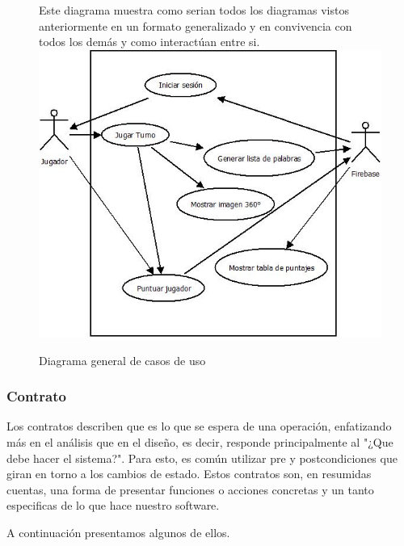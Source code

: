 \begin{figure}[H]
\centering
	Este diagrama muestra como serian todos los diagramas vistos anteriormente en un formato generalizado y en convivencia con todos los demás y como interactúan entre si.\\
	\bigskip\bigskip
   \includegraphics[scale=0.7]{imgs/DCUs.jpeg}
   \begin{center}
   \caption{Diagrama general de casos de uso}
   \end{center}
\end{figure}

\subsubsection{Contrato}
Los contratos describen que es lo que se espera de una operación, enfatizando más en el análisis que en el diseño, es decir, responde principalmente al "¿Que debe hacer el sistema?". Para esto, es común utilizar pre y postcondiciones que giran en torno a los cambios de estado.
Estos contratos son, en resumidas cuentas, una forma de presentar funciones o acciones concretas y un tanto especificas de lo que hace nuestro software.

A continuación presentamos algunos de ellos.

